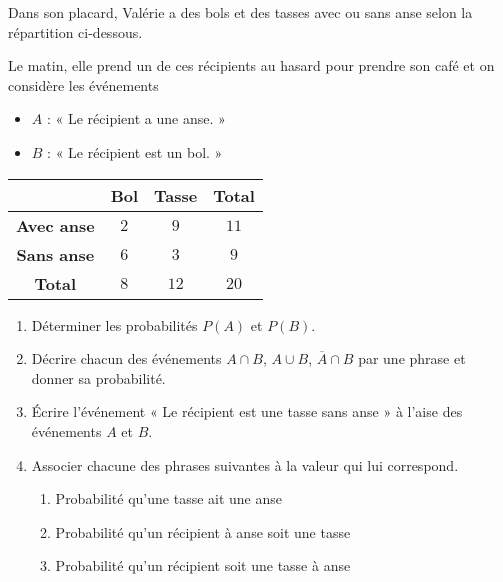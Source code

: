 \documentclass[11pt]{article}
\begin{document}
\begin{exo}
{\small Dans son placard, Valérie a des bols et des tasses avec
ou sans anse selon la répartition ci-dessous.}\\
\begin{minipage}{.6\textwidth}
Le matin, elle prend un de ces
récipients au hasard pour prendre son café et on considère les événements
\begin{itemize}
  \item $A$ : « Le récipient a une anse. »
  \item $B$ : « Le récipient est un bol. »
\end{itemize}
\end{minipage}
\begin{minipage}{.4\textwidth}
  \begin{center}
 \begin{tabular}{cccc}
  \toprule
  & \textbf{Bol} & \textbf{Tasse} & \textbf{Total} \\
  \midrule
  \textbf{Avec anse} & $2$ & $9$ & $11$ \\
  \textbf{Sans anse} & $6$ & $3$ & $9$ \\
  \textbf{Total} & $8$ & $12$ & $20$ \\
  \bottomrule
\end{tabular}
  \end{center}
\end{minipage}
\begin{enumerate}
  \item Déterminer les probabilités $P(A)$ et $P(B)$.
  \item Décrire chacun des événements $A\cap B$, $A\cup B$, $\overline A\cap B$
    par une phrase et donner sa probabilité.
  \item Écrire l'événement « Le récipient est une tasse sans anse » à l'aise des
    événements $A$ et $B$.
  \item Associer chacune des phrases suivantes à la valeur qui lui correspond.\\
    \begin{minipage}[]{.6\textwidth}
      \begin{center}
        \begin{enumerate}
          \item Probabilité qu'une tasse ait une anse
          \item Probabilité qu'un récipient à anse soit une tasse
          \item Probabilité qu'un récipient soit une tasse à anse
        \end{enumerate}

\end{center}
\end{minipage}
\end{enumerate}
\end{exo}
\end{document}
